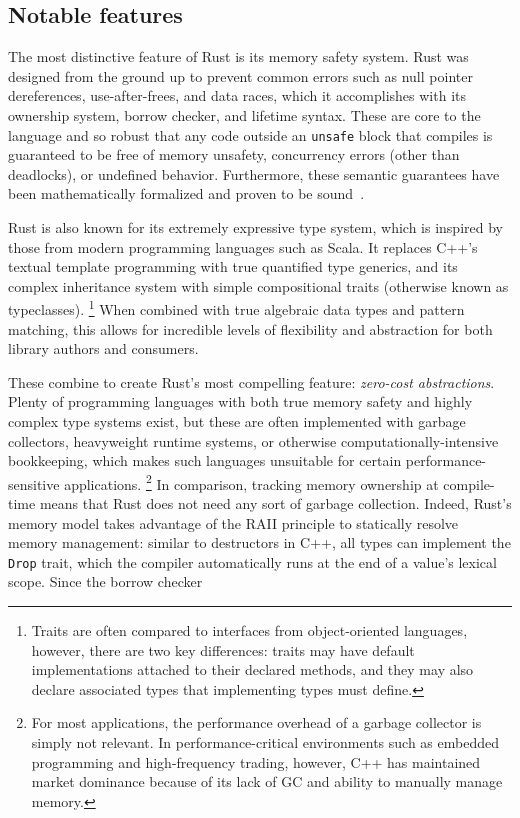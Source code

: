 \subsection{Notable features}
The most distinctive feature of Rust is its memory safety system.
Rust was designed from the ground up to prevent common errors such as null pointer dereferences, use-after-frees, and data races,
which it accomplishes with its ownership system, borrow checker, and lifetime syntax.
These are core to the language and so robust that any code outside an \texttt{unsafe} block that compiles
is guaranteed to be free of memory unsafety, concurrency errors (other than deadlocks), or undefined behavior.
Furthermore, these semantic guarantees have been mathematically formalized and proven to be sound~\cite{rustbelt}.

Rust is also known for its extremely expressive type system, which is inspired by those from modern programming languages such as Scala.
It replaces C++'s textual template programming with true quantified type generics, and its complex inheritance system with simple
compositional traits (otherwise known as typeclasses).
\footnote{Traits are often compared to interfaces from object-oriented languages, however, there are two key differences:
traits may have default implementations attached to their declared methods, and they may also declare associated types that implementing types must define.}
When combined with true algebraic data types and pattern matching, this allows for incredible levels of flexibility and abstraction
for both library authors and consumers.

These combine to create Rust's most compelling feature: \textit{zero-cost abstractions}.
Plenty of programming languages with both true memory safety and highly complex type systems exist, but these are often implemented with
garbage collectors, heavyweight runtime systems, or otherwise computationally-intensive bookkeeping,
which makes such languages unsuitable for certain performance-sensitive applications.
\footnote{For most applications, the performance overhead of a garbage collector is simply not relevant.
In performance-critical environments such as embedded programming and high-frequency trading, however,
C++ has maintained market dominance because of its lack of GC and ability to manually manage memory.}
In comparison, tracking memory ownership at compile-time means that Rust does not need any sort of garbage collection.
Indeed, Rust's memory model takes advantage of the RAII principle to statically resolve memory management:
similar to destructors in C++, all types can implement the \texttt{Drop} trait, which the compiler automatically runs at the end of a value's lexical scope.
Since the borrow checker

